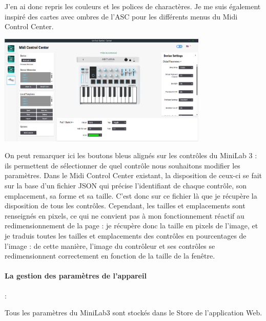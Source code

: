 \documentclass[francais]{rapportPFE}  %
\begin{document}
J'en ai donc repris les couleurs et les polices de charactères. Je me suis également inspiré des cartes avec ombres de l'ASC pour les différents menus du Midi Control Center.

\begin{center}
    \centering
    \includegraphics[width=10cm]{graphics/mcc_new.png}
    \label{fig:test1}
\end{center}

On peut remarquer ici les boutons bleus alignés sur les contrôles du MiniLab 3 : ils permettent de sélectionner de quel contrôle nous souhaitons modifier les paramètres. Dans le Midi Control Center existant, la disposition de ceux-ci se fait sur la base d'un fichier JSON qui précise l'identifiant de chaque contrôle, son emplacement, sa forme et sa taille. C'est donc sur ce fichier là que je récupère la disposition de tous les contrôles. Cependant, les tailles et emplacements sont renseignés en pixels, ce qui ne convient pas à mon fonctionnement réactif au redimensionnement de la page : je récupère donc la taille en pixels de l'image, et je traduis toutes les tailles et emplacements des contrôles en pourcentages de l'image : de cette manière, l'image du contrôleur et ses contrôles se redimensionnent correctement en fonction de la taille de la fenêtre.



\paragraph{La gestion des paramètres de l'appareil}:

Tous les paramètres du MiniLab3 sont stockés dans le Store de l'application Web.
\end{document}
